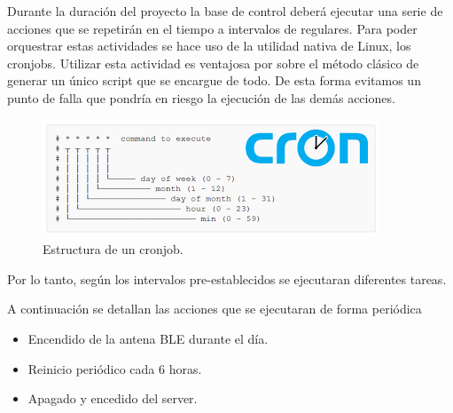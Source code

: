 Durante la duración del proyecto la base de control deberá ejecutar una serie de acciones que se repetirán en el tiempo a intervalos de regulares. Para poder orquestrar estas actividades se hace uso de la utilidad nativa de Linux, los cronjobs. 
Utilizar esta actividad es ventajosa por sobre el método clásico de generar un único script que se encargue de todo. De esta forma evitamos un punto de falla que pondría en riesgo la ejecución de las demás acciones. 

\begin{figure}[H]
	\centering
	\includegraphics[width=0.7\linewidth]{"../Ingenieria de Detalle/ImagenesIngenieria de Detalle/cron"}
	\caption{Estructura de un cronjob.}
	\label{fig:cron}
\end{figure}

Por lo tanto, según los intervalos pre-establecidos se ejecutaran diferentes tareas.

A continuación se detallan las acciones que se ejecutaran de forma periódica  
\begin{itemize}
	\item Encendido de la antena BLE durante el día.
	\item Reinicio periódico cada 6 horas.
	\item Apagado y encedido del server. 
\end{itemize}










